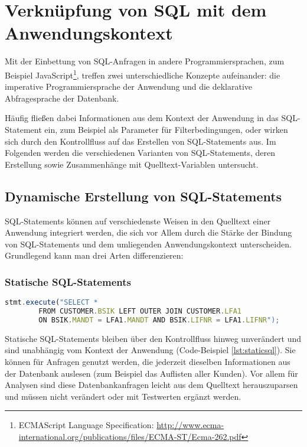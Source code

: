 \section{Verkn{\"u}pfung von SQL mit dem Anwendungskontext}\label{sec:dependencydetection}

%
%

Mit der Einbettung von SQL-Anfragen in andere Programmiersprachen, zum Beispiel JavaScript\footnote{ECMAScript Language 
Specification: \url{http://www.ecma-international.org/publications/files/ECMA-ST/Ecma-262.pdf}}, treffen zwei unterschiedliche Konzepte aufeinander: die imperative Programmiersprache der Anwendung und die deklarative Abfragesprache der Datenbank.

Häufig fließen dabei Informationen aus dem Kontext der Anwendung in das SQL-Statement ein, zum Beispiel als Parameter für Filterbedingungen, oder wirken sich durch den Kontrollfluss auf das Erstellen von SQL-Statements aus.
Im Folgenden werden die verschiedenen Varianten von SQL-Statements, deren Erstellung sowie Zusammenhänge mit Quelltext-Variablen untersucht.

\subsection{Dynamische Erstellung von SQL-Statements}
SQL-Statements können auf verschiedenste Weisen in den Quelltext einer Anwendung integriert werden, die sich vor Allem durch die Stärke der Bindung von SQL-Statements und dem umliegenden Anwendungskontext unterscheiden.
Grundlegend kann man drei Arten differenzieren:

\subsubsection{Statische SQL-Statements}

	\begin{lstlisting}[caption={Statisches Statement eingebettet im Quelltext}, label={lst:staticsql}, language=JavaScript]
		stmt.execute("SELECT *
		FROM CUSTOMER.BSIK LEFT OUTER JOIN CUSTOMER.LFA1
		ON BSIK.MANDT = LFA1.MANDT AND BSIK.LIFNR = LFA1.LIFNR");
	\end{lstlisting}

Statische SQL-Statements bleiben über den Kontrollfluss hinweg unverändert und sind unabhängig vom Kontext der Anwendung (Code-Beispiel \ref{lst:staticsql}).
Sie können für Anfragen genutzt werden, die jederzeit dieselben Informationen aus der Datenbank auslesen (zum Beispiel das Auflisten aller Kunden).
Vor allem für Analysen sind diese Datenbankanfragen leicht aus dem Quelltext herauszuparsen und müssen nicht verändert oder mit Testwerten ergänzt werden.

